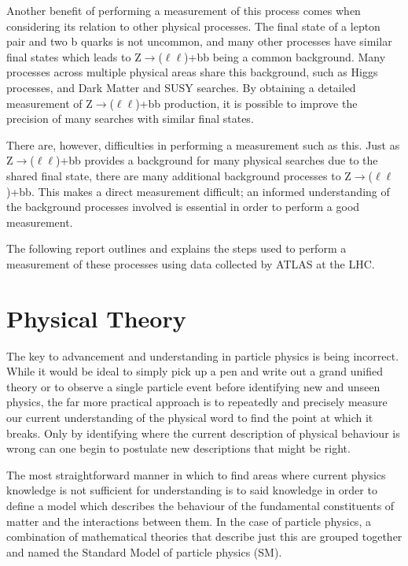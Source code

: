 \documentclass[12pt,a4paper,epsf,portrait,times,epsfig]{report}
\begin{document}
	Another benefit of performing a measurement of this process comes when considering its relation to other physical processes. The final state of a lepton pair and two b quarks is not	uncommon, and many other processes have similar final states which leads to Z$\rightarrow$($\ell\ell$)+bb being a common background. Many processes across multiple physical areas share this background, such as Higgs processes, and Dark Matter and SUSY searches. By obtaining a detailed measurement of Z$\rightarrow$($\ell\ell$)+bb production, it is possible to improve the precision
	of many searches with similar final states. \par

	There are, however, difficulties in performing a measurement such as this. Just as Z$\rightarrow$($\ell\ell$)+bb provides a background for many physical searches due to the shared final state, there are many additional background processes to Z$\rightarrow$($\ell\ell$)+bb. This makes a direct measurement difficult; an informed understanding of the background processes involved is essential in order to perform a good measurement. \par

	The following report outlines and explains the steps used to perform a measurement of these processes using data collected by ATLAS at the LHC.

	\newpage
	
	\chapter{Physical Theory}
	
	The key to advancement and understanding in particle physics is being incorrect. While it would be ideal to simply pick up a pen and write out a grand unified theory or to observe a single particle event before identifying new and unseen physics, the far more practical approach is to repeatedly and precisely measure our current understanding of the physical word to find the point at which it breaks. Only by identifying where the current description of physical behaviour is wrong can one begin to postulate new descriptions that might be right. \par

	The most straightforward manner in which to find areas where current physics knowledge is not sufficient for understanding is to said knowledge in order to define a model which describes the behaviour of the fundamental constituents of matter and the interactions between them. In the case of particle physics, a combination of mathematical theories that describe just this are grouped together and named the Standard Model of particle physics (SM). 
\end{document}
